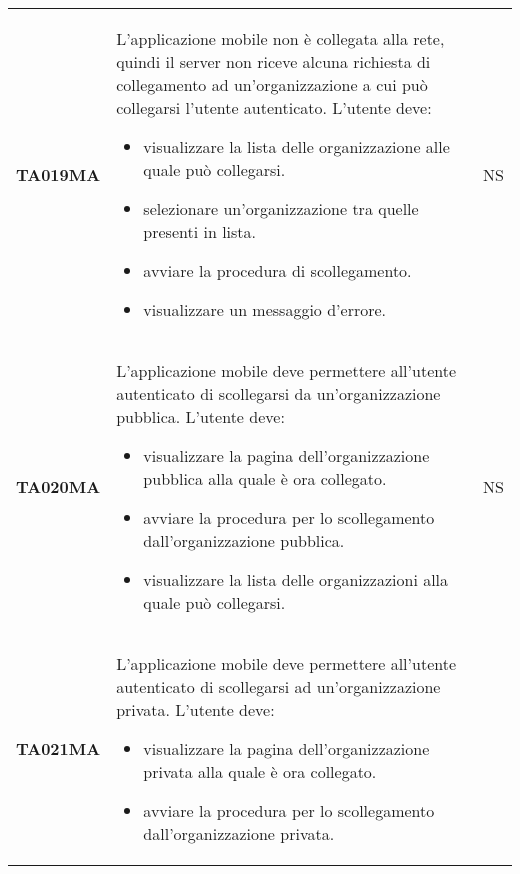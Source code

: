 \documentclass[../piano-di-qualifica.tex]{subfiles}
\begin{document}
\begin{longtable}[H]{>{\centering\bfseries}m{3cm} >{}m{10cm} >{\centering\arraybackslash}m{3cm}}
  TA019MA           & L'applicazione mobile non è collegata alla rete, quindi il server non riceve alcuna richiesta di collegamento ad un'organizzazione a cui può collegarsi l'utente autenticato. \newline
  L'utente deve:
  \begin{itemize}
    \item visualizzare la lista delle organizzazione alle quale può collegarsi.
    \item selezionare un'organizzazione tra quelle presenti in lista.
    \item avviare la procedura di scollegamento.
    \item visualizzare un messaggio d'errore.
  \end{itemize}
                    & NS                                                                                                                                                                                                                                                               \\
  TA020MA           & L'applicazione mobile deve permettere all'utente autenticato di scollegarsi da un'organizzazione pubblica. \newline
  L'utente deve:
  \begin{itemize}
    \item visualizzare la pagina dell'organizzazione pubblica alla quale è ora collegato.
    \item avviare la procedura per lo scollegamento dall'organizzazione pubblica.
    \item visualizzare la lista delle organizzazioni alla quale può collegarsi.
  \end{itemize}
                    & NS                                                                                                                                                                                                                                                               \\
  TA021MA           & L'applicazione mobile deve permettere all'utente autenticato di scollegarsi ad un'organizzazione privata. \newline
  L'utente deve:
  \begin{itemize}
    \item visualizzare la pagina dell'organizzazione privata alla quale è ora collegato.
    \item avviare la procedura per lo scollegamento dall'organizzazione privata.

\end{itemize}
\end{longtable}
\end{document}
